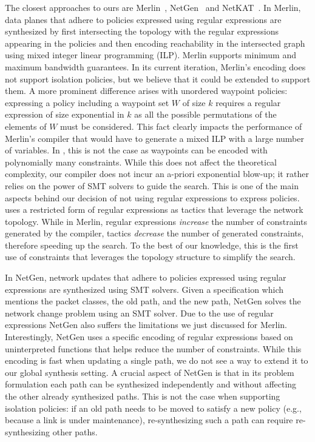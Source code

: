 The closest approaches to ours are Merlin~\cite{merlin},
NetGen~\cite{netgen} and NetKAT~\cite{netkat}.  
In Merlin, data planes that adhere to policies
expressed using regular expressions are synthesized by first
intersecting the topology with the regular expressions appearing in
the policies and then encoding reachability in the intersected graph
using mixed integer linear programming (ILP).
Merlin supports minimum and maximum bandwidth guarantees.
In its current iteration, 
Merlin's encoding does not support isolation policies, but we believe
that it could be extended to support them.  
A more prominent
difference arises with unordered waypoint policies: expressing a
policy including a waypoint set $W$ of size $k$ requires a regular
expression of size exponential in $k$ as all the possible permutations
of the elements of $W$ must be considered. This fact clearly 
impacts the performance of 
Merlin's compiler that would have to generate a mixed ILP with a
large number of variables.  In \Name, this is not the case as waypoints
can be encoded with polynomially many constraints.  While this does
not affect the theoretical complexity, our compiler does not incur
an a-priori exponential blow-up; it rather relies on the power
of SMT solvers to guide the search.  This is one of the main aspects
behind our decision of not using regular expressions to express
policies.  \Name uses a restricted form of regular expressions as 
tactics that leverage the network topology.  While in Merlin,
regular expressions \emph{increase} the number of constraints
generated by the compiler, tactics \emph{decrease}
the number of generated constraints, therefore speeding up the search.
To the best of our knowledge, this is the first use of constraints
that leverages the topology structure to simplify the search.

In NetGen, network updates that adhere to policies expressed using
regular expressions are synthesized using SMT solvers.  Given a
specification which mentions the packet classes, the old path, and the
new path, NetGen solves the network change problem using an SMT solver.
Due to the use of regular expressions NetGen also suffers the
limitations we just discussed for Merlin.  Interestingly, NetGen uses
a specific encoding of regular expressions based on uninterpreted
functions that helps reduce the number of constraints. While this
encoding is fast when updating a single path, we do not see a way to
extend it to our global synthesis setting.  A crucial aspect of NetGen
is that in its problem formulation each path can be synthesized
independently and without affecting the other already synthesized
paths.  This is not the case when supporting isolation policies: if an
old path needs to be moved to satisfy a new policy (e.g., because a
link is under maintenance), re-synthesizing such a path can require
re-synthesizing other paths. 

